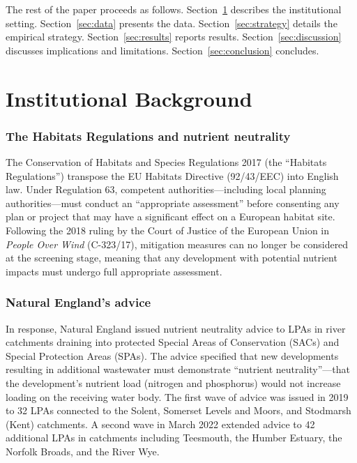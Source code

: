 \documentclass[12pt]{article}
\begin{document}
The rest of the paper proceeds as follows. Section~\ref{sec:background} describes the institutional setting. Section~\ref{sec:data} presents the data. Section~\ref{sec:strategy} details the empirical strategy. Section~\ref{sec:results} reports results. Section~\ref{sec:discussion} discusses implications and limitations. Section~\ref{sec:conclusion} concludes.

\section{Institutional Background}
\label{sec:background}

\subsubsection*{The Habitats Regulations and nutrient neutrality} The Conservation of Habitats and Species Regulations 2017 (the ``Habitats Regulations'') transpose the EU Habitats Directive (92/43/EEC) into English law. Under Regulation 63, competent authorities---including local planning authorities---must conduct an ``appropriate assessment'' before consenting any plan or project that may have a significant effect on a European habitat site. Following the 2018 ruling by the Court of Justice of the European Union in \textit{People Over Wind} (C-323/17), mitigation measures can no longer be considered at the screening stage, meaning that any development with potential nutrient impacts must undergo full appropriate assessment.

\subsubsection*{Natural England's advice} In response, Natural England issued nutrient neutrality advice to LPAs in river catchments draining into protected Special Areas of Conservation (SACs) and Special Protection Areas (SPAs). The advice specified that new developments resulting in additional wastewater must demonstrate ``nutrient neutrality''---that the development's nutrient load (nitrogen and phosphorus) would not increase loading on the receiving water body. The first wave of advice was issued in 2019 to 32 LPAs connected to the Solent, Somerset Levels and Moors, and Stodmarsh (Kent) catchments. A second wave in March 2022 extended advice to 42 additional LPAs in catchments including Teesmouth, the Humber Estuary, the Norfolk Broads, and the River Wye.
\end{document}
